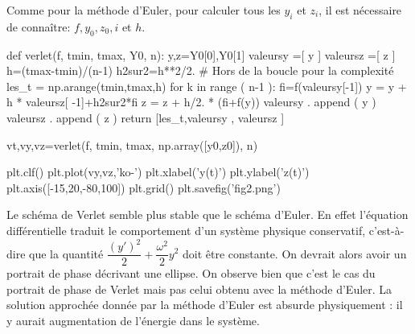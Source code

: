 Comme pour la méthode d'Euler, pour calculer tous les $y_i$ et $z_i$, il est nécessaire de connaître: $f,y_0,z_0,i$ et $h$. 


\begin{pyverbatim}
def verlet(f, tmin, tmax, Y0, n):
    y,z=Y0[0],Y0[1]
    valeursy =[ y ]
    valeursz =[ z ]
    h=(tmax-tmin)/(n-1)
    h2sur2=h**2/2. # Hors de la boucle pour la complexité
    les_t = np.arange(tmin,tmax,h)
    for k in range ( n-1 ):
        fi=f(valeursy[-1])
        y = y + h * valeursz[ -1]+h2sur2*fi   
        z = z + h/2. * (fi+f(y))
        valeursy . append ( y )
        valeursz . append ( z )
    return [les_t,valeursy , valeursz ]
\end{pyverbatim}



\question{}



\begin{pyverbatim}
vt,vy,vz=verlet(f, tmin, tmax, np.array([y0,z0]), n)

plt.clf()
plt.plot(vy,vz,'ko-')
plt.xlabel('y(t)')
plt.ylabel('z(t)')
plt.axis([-15,20,-80,100])
plt.grid()
plt.savefig('fig2.png')
\end{pyverbatim}

\question{} Le schéma de Verlet semble plus stable que le schéma d'Euler. 
En effet l'équation différentielle traduit le comportement d'un système physique conservatif, c'est-à-dire que la quantité $\dfrac{(y')^2}{2} + \dfrac{\omega^2}{2}y^2$ doit être constante. 
On devrait alors avoir un portrait de phase décrivant une ellipse. 
On observe bien que c'est le cas du portrait de phase de Verlet mais pas celui obtenu avec la méthode d'Euler.
La solution approchée donnée par la méthode d'Euler est absurde physiquement : il y aurait augmentation de l'énergie dans le système. 
